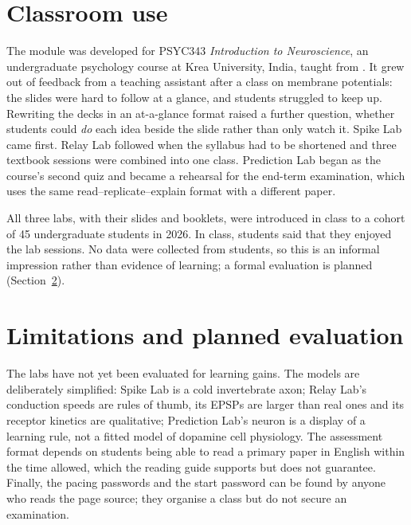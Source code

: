 \documentclass[11pt,a4paper]{article}
\begin{document}
\section{Classroom use}

The module was developed for PSYC343 \emph{Introduction to Neuroscience}, an undergraduate psychology course at Krea University, India, taught from \citet{bear2016}. It grew out of feedback from a teaching assistant after a class on membrane potentials: the slides were hard to follow at a glance, and students struggled to keep up. Rewriting the decks in an at-a-glance format raised a further question, whether students could \emph{do} each idea beside the slide rather than only watch it. Spike Lab came first. Relay Lab followed when the syllabus had to be shortened and three textbook sessions were combined into one class. Prediction Lab began as the course's second quiz and became a rehearsal for the end-term examination, which uses the same read--replicate--explain format with a different paper.

All three labs, with their slides and booklets, were introduced in class to a cohort of 45 undergraduate students in 2026. In class, students said that they enjoyed the lab sessions. No data were collected from students, so this is an informal impression rather than evidence of learning; a formal evaluation is planned (Section~\ref{sec:limits}).

\section{Limitations and planned evaluation}\label{sec:limits}

The labs have not yet been evaluated for learning gains. The models are deliberately simplified: Spike Lab is a cold invertebrate axon; Relay Lab's conduction speeds are rules of thumb, its EPSPs are larger than real ones and its receptor kinetics are qualitative; Prediction Lab's neuron is a display of a learning rule, not a fitted model of dopamine cell physiology. The assessment format depends on students being able to read a primary paper in English within the time allowed, which the reading guide supports but does not guarantee. Finally, the pacing passwords and the start password can be found by anyone who reads the page source; they organise a class but do not secure an examination.
\end{document}
